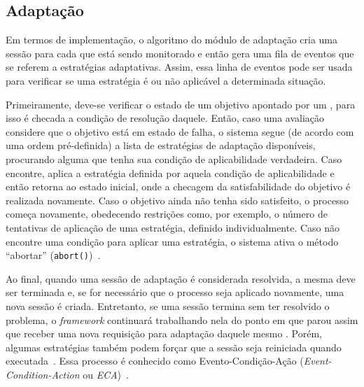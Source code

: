 \subsection{Adaptação}
\label{sec-referencial-zanshin-adaptacao}
Em termos de implementação, o algoritmo do módulo de adaptação cria uma sessão para cada \awreq que está sendo monitorado e então gera uma fila de eventos que se referem a estratégias adaptativas. Assim, essa linha de eventos pode ser usada para verificar se uma estratégia é ou não aplicável a determinada situação. 

Primeiramente, deve-se verificar o estado de um objetivo apontado por um \awreq, para isso é checada a condição de resolução daquele. Então, caso uma avaliação considere que o objetivo está em estado de falha, o sistema segue (de acordo com uma ordem pré-definida) a lista de estratégias de adaptação disponíveis, procurando alguma que tenha sua condição de aplicabilidade verdadeira. Caso encontre, aplica a estratégia definida por aquela condição de aplicabilidade e então retorna ao estado inicial, onde a checagem da satisfabilidade do objetivo é realizada novamente. Caso o objetivo ainda não tenha sido satisfeito, o processo começa novamente, obedecendo restrições como, por exemplo, o número de tentativas de aplicação de uma estratégia, definido individualmente. Caso não encontre uma condição para aplicar uma estratégia, o sistema ativa o método ``abortar'' (\texttt{abort()})~\cite{souza2013requirements}. 

Ao final, quando uma sessão de adaptação é considerada resolvida, a mesma deve ser terminada e, se for necessário que o processo seja aplicado novamente, uma nova sessão é criada. Entretanto, se uma sessão termina sem ter resolvido o problema, o \textit{framework} continuará trabalhando nela do ponto em que parou assim que receber uma nova requisição para adaptação daquele mesmo \awreq. Porém, algumas estratégias também podem forçar que a sessão seja reiniciada quando executada~\cite{souza2013requirements}. Essa processo é conhecido como Evento-Condição-Ação (\textit{Event-Condition-Action} ou \textit{ECA})~\cite{morin2009models}.

